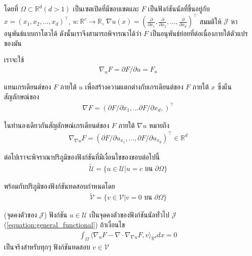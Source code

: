 \hspace{1cm} โดยที่ $\Omega \subset \mathbb{R}^{d} (d>1)$ เป็นเซตเปิดที่มีขอบเขตและ $F$ เป็นฟังก์ชันนัลที่ขึ้นอยู่กับ $x=(x_1,x_2,...,x_d)^\top$, $u: \mathbb{R}^{c} \rightarrow \mathbb{R}$, $\nabla u (x) = ( \frac{\partial}{\partial x_1},\frac{\partial}{\partial x_2}, ... , \frac{\partial}{\partial x_d} )^\top$ สมมติให้ $\mathcal{J}$ หาอนุพันธ์แบบกาโตวได้ ดังนั้นเราจึงสามารถพิจารณาได้ว่า $F$ เป็นอนุพันธ์ย่อยที่ต่อเนื่องภายใต้ตัวแปรของมัน

เราจะใช้
\begin{align}
    \nabla_{u} F = \partial F / \partial u = F_u
\end{align}

แทนเกรเดียนต์ของ $F$ ภายใต้ $u$ เพื่อสร้างความแตกต่างกับเกรเดียนต์ของ $F$ ภายใต้ $x$ ซึ่งแืนสัญลักษณ์ของ
\begin{align}
    \nabla F = (\partial F / \partial x_1, ... \partial F / \partial x_d, )^\top
\end{align}

ในทำนองเดียวกันสัญลักษณ์เกรเดียนต์ของ $F$ ภายใต้ $\nabla u$ หมายถึง
\begin{align}
    \nabla_{\nabla u} F = (\partial F / \partial u_{x_1},..., \partial F / \partial u_{x_d})^\top \in \mathbb{R}^d
\end{align}

\hspace{1cm}ต่อไปเราจะพิจราณาปริภูมิของฟังก์ชันที่มีเงื่อนไขของขอบต่อไปนี้
\begin{align}
    \tilde{\mathcal{U}} = \{u \in \mathcal{U} | u = c \text{ บน } \partial \Omega \}
\end{align}

พร้อมกับปริภูมิของฟังก์ชันทดสอบกำหนดโดย
\begin{align}
    \tilde{\mathcal{V}} = \{v \in \mathcal{V} | v = 0 \text{ บน } \partial \Omega \}
\end{align}

\begin{Lemma}
    (จุดคงตัวของ $\mathcal{J}$) ฟังก์ชัน $u \in \mathcal{U}$ เป็นจุดคงตัวของฟังก์ชันนัลทั่วไป $\mathcal{J}$ (\ref{equation:general_functional}) ถ้าเงื่อนไข
    \begin{align}
        \int_{\Omega} \Big \langle \nabla_u F - \nabla \cdot \nabla_{\nabla u} F,v \Big \rangle_{\mathbb{R}^{d}} dx = 0
        \label{equation:lemma_stationarypoint}
    \end{align}
    \label{lemma:stationary_point}
    เป็นจริงสำหรับทุกๆ ฟังก์ชันทดสอบ $v \in \mathcal{V}$
\end{Lemma}

